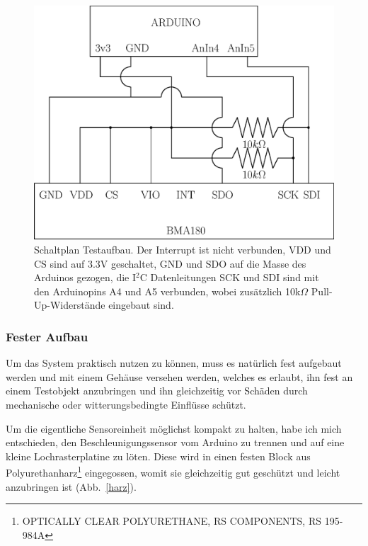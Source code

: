 \documentclass[12pt,a4paper,twoside,BCOR=12.5mm]{scrartcl}
\begin{document}
\begin{figure}[ht]
\centering
\includegraphics[scale=.59]{schematics.eps}
\caption{Schaltplan Testaufbau. Der Interrupt ist nicht verbunden, VDD und CS sind auf 3.3V geschaltet, GND und SDO auf die Masse des Arduinos gezogen, die I$^2$C Datenleitungen SCK und SDI sind mit den Arduinopins A4 und A5 verbunden, wobei zusätzlich 10k$\Omega$ Pull-Up-Widerstände eingebaut sind.}
\label{schematics}
\end{figure}


\newpage
\subsubsection{Fester Aufbau}

Um das System praktisch nutzen zu können, muss es natürlich fest aufgebaut werden und mit einem Gehäuse versehen werden, welches es erlaubt, ihn fest an einem Testobjekt anzubringen und ihn gleichzeitig vor Schäden durch mechanische oder witterungsbedingte Einflüsse schützt.

Um die eigentliche Sensoreinheit möglichst kompakt zu halten, habe ich mich entschieden, den Beschleunigungssensor vom Arduino zu trennen und auf eine kleine Lochrasterplatine zu löten. Diese wird in einen festen Block aus Polyurethanharz\footnote{OPTICALLY CLEAR POLYURETHANE, RS COMPONENTS, RS 195-984A} eingegossen, womit sie gleichzeitig gut geschützt und leicht anzubringen ist \mbox{(Abb. \ref{harz})}. \\
\end{document}
